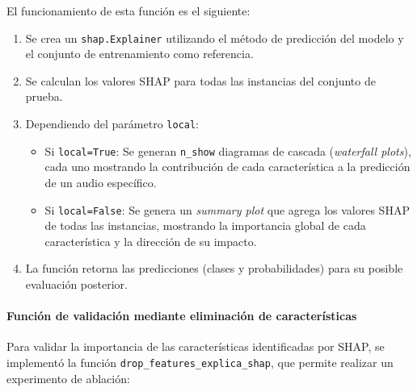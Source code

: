 El funcionamiento de esta función es el siguiente:

\begin{enumerate}
    \item Se crea un \texttt{shap.Explainer} utilizando el método de predicción del modelo y el conjunto de entrenamiento como referencia.
    \item Se calculan los valores SHAP para todas las instancias del conjunto de prueba.
    \item Dependiendo del parámetro \texttt{local}:
    \begin{itemize}
        \item Si \texttt{local=True}: Se generan \texttt{n\_show} diagramas de cascada (\textit{waterfall plots}), cada uno mostrando la contribución de cada característica a la predicción de un audio específico.
        \item Si \texttt{local=False}: Se genera un \textit{summary plot} que agrega los valores SHAP de todas las instancias, mostrando la importancia global de cada característica y la dirección de su impacto.
    \end{itemize}
    \item La función retorna las predicciones (clases y probabilidades) para su posible evaluación posterior.
\end{enumerate}

\paragraph{Función de validación mediante eliminación de características}

Para validar la importancia de las características identificadas por SHAP, se implementó la función \texttt{drop\_features\_explica\_shap}, que permite realizar un experimento de ablación:

